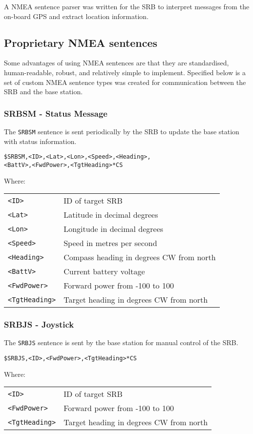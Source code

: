 \documentclass[a4paper]{IEEEtran}
\newenvironment{nmeaspec}[1]
{
\newcommand{\field}[2]{\texttt{##1} & ##2 \\}
\vspace{0.2cm}
\noindent\texttt{#1}
\vspace{0.2cm}

\noindent Where: \vspace{0.1cm}\\  \noindent
\vspace{0.2cm}
\begin{tabular}{ll}
}
{
\end{tabular}
}
\begin{document}
A NMEA sentence parser was written for the SRB to interpret messages from the on-board GPS and extract location information.

\subsection{Proprietary NMEA sentences}
Some advantages of using NMEA sentences are that they are standardised, human-readable, robust, and relatively simple to implement. Specified below is a set of custom NMEA sentence types was created for communication between the SRB and the base station.

\subsubsection{SRBSM - Status Message}
The \texttt{SRBSM} sentence is sent periodically by the SRB to update the base station with status information.

\begin{nmeaspec}{\$SRBSM,<ID>,<Lat>,<Lon>,<Speed>,<Heading>,\\<BattV>,<FwdPower>,<TgtHeading>*CS}
\field{<ID>}{ID of target SRB}
\field{<Lat>}{Latitude in decimal degrees}
\field{<Lon>}{Longitude in decimal degrees}
\field{<Speed>}{Speed in metres per second}
\field{<Heading>}{Compass heading in degrees CW from north}
\field{<BattV>}{Current battery voltage}
\field{<FwdPower>}{Forward power from -100 to 100}
\field{<TgtHeading>}{Target heading in degrees CW from north}
\end{nmeaspec}

\subsubsection{SRBJS - Joystick}
The \texttt{SRBJS} sentence is sent by the base station for manual control of the SRB.

\begin{nmeaspec}{\$SRBJS,<ID>,<FwdPower>,<TgtHeading>*CS}
\field{<ID>}{ID of target SRB}
\field{<FwdPower>}{Forward power from -100 to 100}
\field{<TgtHeading>}{Target heading in degrees CW from north}
\end{nmeaspec}



\end{document}
